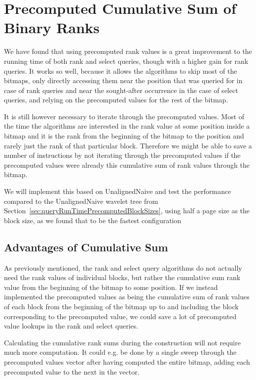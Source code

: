 \section{Precomputed Cumulative Sum of Binary Ranks}
We have found that using precomputed rank values is a great improvement to the running time of both rank and select queries, though with a higher gain for rank queries.
It works so well, because it allows the algorithms to skip most of the bitmaps, only directly accessing them near the position that was queried for in case of rank queries and near the sought-after occurrence in the case of select queries, and relying on the precomputed values for the rest of the bitmap.

It is still however necessary to iterate through the precomputed values.
Most of the time the algorithms are interested in the rank value at some position inside a bitmap and it is the rank from the beginning of the bitmap to the position and rarely just the rank of that particular block.
Therefore we might be able to save a number of instructions by not iterating through the precomputed values if the precomputed values were already this cumulative sum of rank values through the bitmap.

We will implement this based on UnalignedNaive and test the performance compared to the UnalignedNaive wavelet tree from Section~\ref{sec:queryRunTimePrecomputedBlockSizes}, using half a page size as the block size, as we found that to be the fastest configuration

\subsection{Advantages of Cumulative Sum}
As previously mentioned, the rank and select query algorithms do not actually need the rank values of individual blocks, but rather the cumulative sum rank value from the beginning of the bitmap to some position.
If we instead implemented the precomputed values as being the cumulative sum of rank values of each block from the beginning of the bitmap up to and including the block corresponding to the precomputed value, we could save a lot of precomputed value lookups in the rank and select queries.

Calculating the cumulative rank sums during the construction will not require much more computation.
It could e.g. be done by a single sweep through the precomputed values vector after having computed the entire bitmap, adding each precomputed value to the next in the vector.


